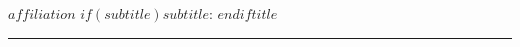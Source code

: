 
\pagestyle{empty}

\begin{center}
\textsc{$affiliation$ $if(subtitle)$$subtitle$: $endif$$title$} \\
\noindent\rule{12cm}{0.4pt}
\end{center}

\vspace{2mm}